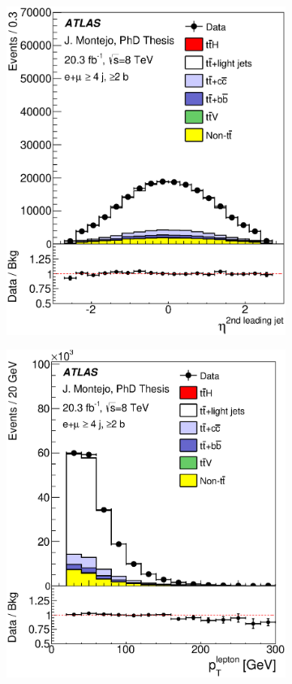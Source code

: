 \begin{figure}[tp!]
\begin{subfigure}{0.32\textwidth}
  \includegraphics[width=\textwidth]{Modeling/Figures/plots_4j2b/jet2_eta_ELEMUON_4jetin2btagin_NOMINAL.eps}
  \caption{} \end{subfigure}
  \begin{subfigure}{0.32\textwidth}
  \includegraphics[width=\textwidth]{Modeling/Figures/plots_4j2b/lep_pt_ELEMUON_4jetin2btagin_NOMINAL.eps}

\end{subfigure}
\end{figure}
